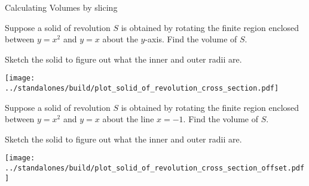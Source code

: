 \documentclass[../main.tex]{subfiles}
\begin{document}
\begin{lesson}{Calculating Volumes by slicing}
  \begin{example}
    Suppose a solid of revolution \(S\) is obtained by rotating the finite region enclosed between \(y = x^{2}\) and \(y = x\) about the \(y\)-axis.  Find the volume of \(S\).


    Sketch the solid to figure out what the inner and outer radii are.

    \begin{center}
      \texttt{[image: ../standalones/build/plot\_solid\_of\_revolution\_cross\_section.pdf]}
    \end{center}
  \end{example}
  \clearpage

  \begin{example}
    Suppose a solid of revolution \(S\) is obtained by rotating the finite region enclosed between \(y = x^{2}\) and \(y = x\) about the line \(x = -1\).  Find the volume of \(S\).

    Sketch the solid to figure out what the inner and outer radii are.

    \begin{center}
      \hspace{2in}\texttt{[image: ../standalones/build/plot\_solid\_of\_revolution\_cross\_section\_offset.pdf]}
    \end{center}
  \end{example}
\end{lesson}
\end{document}
